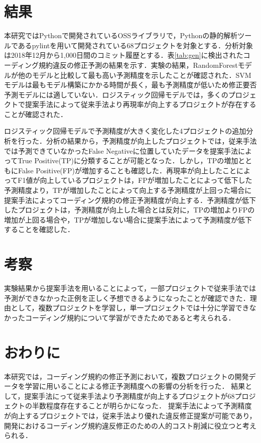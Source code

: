 \documentclass[twocolumn]{jarticle} %
\begin{document}
\section{結果}

本研究ではPythonで開発されているOSSライブラリで，Pythonの静的解析ツールであるpylintを用いて開発されている68プロジェクトを対象とする．分析対象は2018年12月から1,000日間のコミット履歴とする．表\ref{tab:gen}に検出されたコーディング規約違反の修正予測の結果を示す．実験の結果，RandomForestモデルが他のモデルと比較して最も高い予測精度を示したことが確認された．SVMモデルは最もモデル構築にかかる時間が長く，最も予測精度が低いため修正要否予測モデルには適していない．ロジスティック回帰モデルでは，多くのプロジェクトで提案手法によって従来手法より再現率が向上するプロジェクトが存在することが確認された．

ロジスティック回帰モデルで予測精度が大きく変化した4プロジェクトの追加分析を行った．分析の結果から，予測精度が向上したプロジェクトでは，従来手法では予測できていなかったFalse Negativeに位置していたデータを提案手法によってTrue Positive(TP)に分類することが可能となった．しかし，TPの増加とともにFalse Positive(FP)が増加することも確認した．再現率が向上したことによってF1値が向上しているプロジェクトは，FPが増加したことによって低下した予測精度より，TPが増加したことによって向上する予測精度が上回った場合に提案手法によってコーディング規約の修正予測精度が向上する．予測精度が低下したプロジェクトは，予測精度が向上した場合とは反対に，TPの増加よりFPの増加が上回る場合や，TPが増加しない場合に提案手法によって予測精度が低下することを確認した．


\section{考察}

実験結果から提案手法を用いることによって，一部プロジェクトで従来手法では予測ができなかった正例を正しく予想できるようになったことが確認できた．理由として，複数プロジェクトを学習し，単一プロジェクトでは十分に学習できなかったコーディング規約について学習ができたためであると考えられる．

\section{おわりに}

本研究では，コーディング規約の修正予測において，複数プロジェクトの開発データを学習に用いることによる修正予測精度への影響の分析を行った．
結果として，提案手法にって従来手法より予測精度が向上するプロジェクトが68プロジェクトの半数程度存在することが明らかになった．
提案手法によって予測精度が向上するプロジェクトでは，従来手法より優れた違反修正提案が可能であり，開発におけるコーディング規約違反修正のための人的コスト削減に役立つと考えられる．








\end{document}
